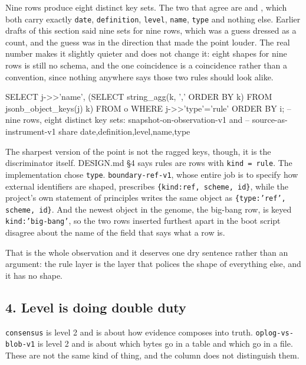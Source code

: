 Nine rows produce eight distinct key sets. The two that agree are  and , which both carry exactly \texttt{date}, \texttt{definition}, \texttt{level}, \texttt{name}, \texttt{type} and nothing else. Earlier drafts of this section said nine sets for nine rows, which was a guess dressed as a count, and the guess was in the direction that made the point louder. The real number makes it slightly quieter and does not change it: eight shapes for nine rows is still no schema, and the one coincidence is a coincidence rather than a convention, since nothing anywhere says those two rules should look alike.

\begin{Check}
SELECT j->>'name',
       (SELECT string_agg(k, ',' ORDER BY k) FROM jsonb_object_keys(j) k)
FROM o WHERE j->>'type'='rule' ORDER BY i;
-- nine rows, eight distinct key sets: snapshot-on-observation-v1 and
-- source-as-instrument-v1 share date,definition,level,name,type
\end{Check}

The sharpest version of the point is not the ragged keys, though, it is the discriminator itself. DESIGN.md \S4 says rules are rows with \texttt{kind = rule}. The implementation chose \texttt{type}. \texttt{boundary-ref-v1}, whose entire job is to specify how external identifiers are shaped, prescribes \texttt{\{kind:ref, scheme, id\}}, while the project's own statement of principles writes the same object as \texttt{\{type:'ref', scheme, id\}}. And the newest object in the genome, the big-bang row, is keyed \texttt{kind:'big-bang'}, so the two rows inserted furthest apart in the boot script disagree about the name of the field that says what a row is.

That is the whole observation and it deserves one dry sentence rather than an argument: the rule layer is the layer that polices the shape of everything else, and it has no shape.

\subsection*{4. Level is doing double duty}

\texttt{consensus} is level 2 and is about how evidence composes into truth. \texttt{oplog-vs-blob-v1} is level 2 and is about which bytes go in a table and which go in a file. These are not the same kind of thing, and the column does not distinguish them.

